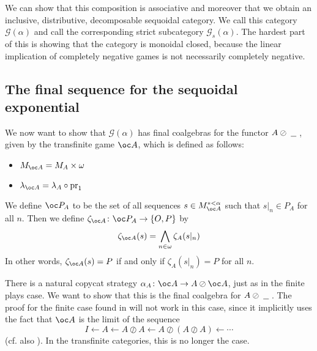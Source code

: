 \documentclass[a4paper,UKenglish]{lipics-v2016}
\theoremstyle{plain}
\theoremstyle{definition}
\newcommand*\from{\colon}
\DeclareMathOperator{\pr}{pr}
\newcommand{\sequoid}{\oslash}
\newcommand{\G}{\mathcal G}
\newcommand{\OP}{\{O,P\}}
\newcommand{\blank}{\;\underline{\hspace{1.5ex}}\;}
\newlength{\arrow}
\begin{document}
We can show that this composition is associative and moreover that we obtain an inclusive, distributive, decomposable sequoidal category.  We call this category $\G(\alpha)$ and call the corresponding strict subcategory $\G_s(\alpha)$.  The hardest part of this is showing that the category is monoidal closed, because the linear implication of completely negative games is not necessarily completely negative.  

\subsection{The final sequence for the sequoidal exponential}

We now want to show that $\G(\alpha)$ has final coalgebras for the functor $A\sequoid\blank$, given by the transfinite game $\oc A$, which is defined as follows:
\begin{itemize}
  \item $M_{\oc A} = M_A \times \omega$
  \item $\lambda_{\oc A} = \lambda_A \circ \pr_1$
\end{itemize}
We define $\oc P_A$ to be the set of all sequences $s\in M_{\oc A}^{*<\alpha}$ such that $s\vert_n\in P_A$ for all $n$.  Then we define $\zeta_{\oc A}\from\oc P_A\to\OP$ by
\[
  \zeta_{\oc A}(s) = \bigwedge_{n\in\omega}\zeta_A(s\vert_n)
  \]
In other words, $\zeta_{\oc A}(s)=P$ if and only if $\zeta_A(s\vert_n)=P$ for all $n$.

There is a natural copycat strategy $\alpha_A\from \oc A \to A \sequoid \oc A$, just as in the finite plays case.  We want to show that this is the final coalgebra for $A\sequoid\blank$.  The proof for the finite case found in \cite{martinsthesis} will not work in this case, since it implicitly uses the fact that $\oc A$ is the limit of the sequence
\[
  I \leftarrow A \leftarrow A \sequoid A \leftarrow A \sequoid (A \sequoid A) \leftarrow \cdots
  \]
(cf. also \cite{MelliesCofCommCom}).  In the transfinite categories, this is no longer the case.  
\end{document}
